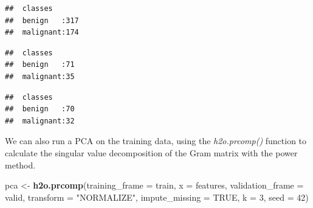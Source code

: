 \documentclass[]{article}
\newenvironment{Shaded}{\begin{snugshade}}{\end{snugshade}}
\newcommand{\KeywordTok}[1]{\textcolor[rgb]{0.13,0.29,0.53}{\textbf{{#1}}}}
\newcommand{\DataTypeTok}[1]{\textcolor[rgb]{0.13,0.29,0.53}{{#1}}}
\newcommand{\DecValTok}[1]{\textcolor[rgb]{0.00,0.00,0.81}{{#1}}}
\newcommand{\StringTok}[1]{\textcolor[rgb]{0.31,0.60,0.02}{{#1}}}
\newcommand{\OtherTok}[1]{\textcolor[rgb]{0.56,0.35,0.01}{{#1}}}
\newcommand{\NormalTok}[1]{{#1}}
\begin{document}
\begin{Shaded}
\end{Shaded}

\begin{verbatim}
##  classes       
##  benign   :317 
##  malignant:174
\end{verbatim}

\begin{Shaded}
\end{Shaded}

\begin{verbatim}
##  classes      
##  benign   :71 
##  malignant:35
\end{verbatim}

\begin{Shaded}
\end{Shaded}

\begin{verbatim}
##  classes      
##  benign   :70 
##  malignant:32
\end{verbatim}

We can also run a PCA on the training data, using the
\emph{h2o.prcomp()} function to calculate the singular value
decomposition of the Gram matrix with the power method.

\begin{Shaded}
\begin{Highlighting}[]
\NormalTok{pca <-}\StringTok{ }\KeywordTok{h2o.prcomp}\NormalTok{(}\DataTypeTok{training_frame =} \NormalTok{train,}
           \DataTypeTok{x =} \NormalTok{features,}
           \DataTypeTok{validation_frame =} \NormalTok{valid,}
           \DataTypeTok{transform =} \StringTok{"NORMALIZE"}\NormalTok{,}
           \DataTypeTok{impute_missing =} \OtherTok{TRUE}\NormalTok{,}
           \DataTypeTok{k =} \DecValTok{3}\NormalTok{,}
           \DataTypeTok{seed =} \DecValTok{42}\NormalTok{)}
\end{Highlighting}
\end{Shaded}
\end{document}
